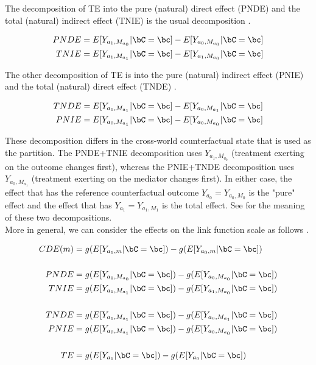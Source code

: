 \documentclass[dvipdfmx,10pt]{article}
\begin{document}
The decomposition of TE into the pure (natural) direct effect (PNDE) and the total (natural) indirect effect (TNIE) is the usual decomposition \cite{pearlDirectIndirectEffects2001}.

\begin{align*}
  PNDE &= E[Y_{a_{1},M_{a_{0}}} | \bC = \bc] - E[Y_{a_{0},M_{a_{0}}} | \bC = \bc]\\
  TNIE &= E[Y_{a_{1},M_{a_{1}}} | \bC = \bc] - E[Y_{a_{1},M_{a_{0}}} | \bC = \bc]\\
\end{align*}

The other decomposition of TE is into the pure (natural) indirect effect (PNIE) and the total (natural) direct effect (TNDE) \cite{robinsIdentifiabilityExchangeabilityDirect1992}.

\begin{align*}
  TNDE &= E[Y_{a_{1},M_{a_{1}}} | \bC = \bc] - E[Y_{a_{0},M_{a_{1}}} | \bC = \bc]\\
  PNIE &= E[Y_{a_{0},M_{a_{1}}} | \bC = \bc] - E[Y_{a_{0},M_{a_{0}}} | \bC = \bc]\\
\end{align*}

These decomposition differs in the cross-world counterfactual state that is used as the partition. The PNDE+TNIE decomposition uses \(Y_{a_{1},M_{a_{0}}}\) (treatment exerting on the outcome changes first), whereas the PNIE+TNDE decomposition uses \(Y_{a_{0},M_{a_{1}}}\) (treatment exerting on the mediator changes first). In either case, the effect that has the reference counterfactual outcome \(Y_{a_{0}} = Y_{a_{0},M_{0}}\) is the "pure" effect and the effect that has \(Y_{a_{1}} = Y_{a_{1},M_{1}}\) is the total effect. See \cite{vanderweeleThreewayDecompositionTotal2013} for the meaning of these two decompositions.\\

More in general, we can consider the effects on the link function scale as follows \cite{starkopfComparisonFiveSoftware2017}.

\begin{align*}
  CDE(m) &= g(E[Y_{a_{1},m} | \bC = \bc]) - g(E[Y_{a_{0},m} | \bC = \bc])\\
  \\
  PNDE &= g(E[Y_{a_{1},M_{a_{0}}} | \bC = \bc]) - g(E[Y_{a_{0},M_{a_{0}}} | \bC = \bc])\\
  TNIE &= g(E[Y_{a_{1},M_{a_{1}}} | \bC = \bc]) - g(E[Y_{a_{1},M_{a_{0}}} | \bC = \bc])\\
  \\
  TNDE &= g(E[Y_{a_{1},M_{a_{1}}} | \bC = \bc]) - g(E[Y_{a_{0},M_{a_{1}}} | \bC = \bc])\\
  PNIE &= g(E[Y_{a_{0},M_{a_{1}}} | \bC = \bc]) - g(E[Y_{a_{0},M_{a_{0}}} | \bC = \bc])\\
  \\
  TE &= g(E[Y_{a_{1}} | \bC = \bc]) - g(E[Y_{a_{0}} | \bC = \bc])\\
\end{align*}
\end{document}
